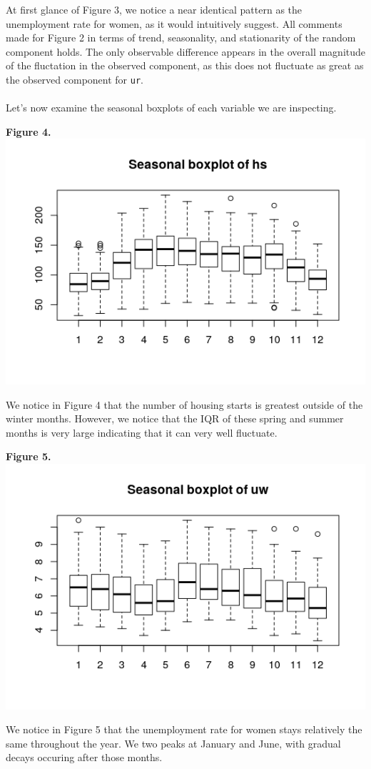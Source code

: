\documentclass[11pt]{article}
\begin{document}
At first glance of Figure 3, we notice a near identical pattern as the unemployment rate for women, as it would intuitively suggest. All comments made for Figure 2 in terms of trend, seasonality, and stationarity of the random component holds. The only observable difference appears in the overall magnitude of the fluctation in the observed component, as this does not fluctuate as great as the observed component for {\tt ur}.
\\\\
Let's now examine the seasonal boxplots of each variable we are inspecting.
\begin{center}
\textbf{Figure 4.}
\\
\includegraphics[scale=1]{bp-hs}
\end{center}
We notice in Figure 4 that the number of housing starts is greatest outside of the winter months. However, we notice that the IQR of these spring and summer months is very large indicating that it can very well fluctuate.

\begin{center}
\textbf{Figure 5.}
\\
\includegraphics[scale=1]{bp-uw}
\end{center}
We notice in Figure 5 that the unemployment rate for women stays relatively the same throughout the year. We two peaks at January and June, with gradual decays occuring after those months.
\end{document}
